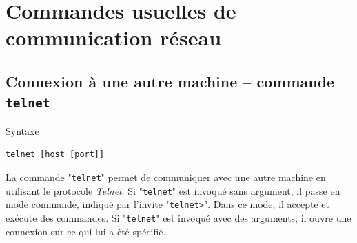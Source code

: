 %
%

\setcounter{remarque-cnt}{1}
\setcounter{example-cnt}{1}
\chapter{Commandes usuelles de communication r{\'e}seau}
\thispagestyle{fancy}

\section{Connexion {\`a} une autre machine -- commande {\tt telnet}}

\begin{definition}{Syntaxe}
\begin{verbatim}
telnet [host [port]]
\end{verbatim}
\end{definition}

La commande "{\tt telnet}" permet de communiquer avec une autre machine en
utilisant le protocole {\sl Telnet}. Si "{\tt telnet}" est invoqu{\'e} sans
argument, il passe en mode commande, indiqu{\'e} par l'invite
"\verb=telnet>=". Dans ce mode, il accepte et ex{\'e}cute des commandes.
Si "{\tt telnet}" est invoqu{\'e} avec des arguments, il ouvre une connexion
sur ce qui lui a {\'e}t{\'e} sp{\'e}cifi{\'e}.


